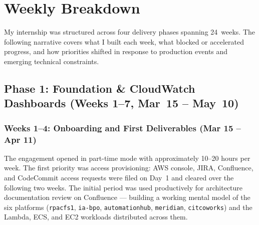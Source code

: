 
\chapter{Weekly Breakdown}
\label{chap:weekly_breakdown}

My internship was structured across four delivery phases spanning 24~weeks.
The following narrative covers what I built each week, what blocked or
accelerated progress, and how priorities shifted in response to production
events and emerging technical constraints.

\section{Phase 1: Foundation \& CloudWatch Dashboards (Weeks 1--7, Mar~15 -- May~10)}
\label{sec:wb_phase1}

\subsection{Weeks 1--4: Onboarding and First Deliverables (Mar 15 -- Apr 11)}

The engagement opened in part-time mode with approximately 10--20 hours per
week. The first priority was access provisioning: AWS console, JIRA,
Confluence, and CodeCommit access requests were filed on Day~1 and cleared
over the following two weeks. The initial period was used productively for
architecture documentation review on Confluence --- building a working mental
model of the six platforms (\texttt{rpacfs1}, \texttt{ia-bpo},
\texttt{automationhub}, \texttt{meridian}, \texttt{citcoworks}) and the
Lambda, ECS, and EC2 workloads distributed across them.

